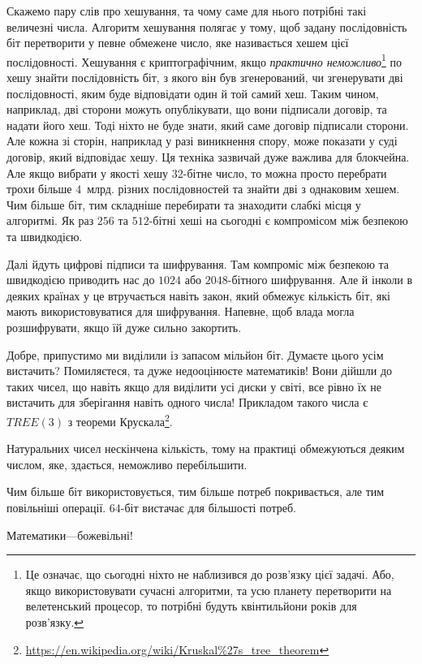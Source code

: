 \documentclass{book}
\newcommand{\kruskalref}{\href{https://en.wikipedia.org/wiki/Kruskal\%27s_tree_theorem}{https://en.wikipedia.org/wiki/Kruskal\%27s\_tree\_theorem}}
\begin{document}
Скажемо пару слів про хешування, та чому саме для нього потрібні такі величезні числа.
Алгоритм хешування полягає у тому, щоб задану послідовність біт перетворити у певне обмежене число, яке називається хешем цієї послідовності.
Хешування є криптографічним, якщо \textit{практично неможливо}\footnote{
  Це означає, що сьогодні ніхто не наблизився до розв'язку цієї задачі.
  Або, якщо використовувати сучасні алгоритми, та усю планету перетворити на велетенський процесор, то потрібні будуть квінтильйони років для розв'язку.
} по хешу знайти послідовність біт, з якого він був згенерований, чи згенерувати дві послідовності, яким буде відповідати один й той самий хеш.
Таким чином, наприклад, дві сторони можуть опублікувати, що вони підписали договір, та надати його хеш.
Тоді ніхто не буде знати, який саме договір підписали сторони.
Але кожна зі сторін, наприклад у разі виникнення спору, може показати у суді договір, який відповідає хешу.
Ця техніка зазвичай дуже важлива для блокчейна.
Але якщо вибрати у якості хешу $32$-бітне число, то можна просто перебрати трохи більше $4$~млрд. різних послідовностей та знайти дві з однаковим хешем.
Чим більше біт, тим складніше перебирати та знаходити слабкі місця у алгоритмі.
Як раз $256$ та $512$-бітні хеші на сьогодні є компромісом між безпекою та швидкодією.

Далі йдуть цифрові підписи та шифрування.
Там компроміс між безпекою та швидкодією приводить нас до $1024$ або $2048$-бітного шифрування.
Але й інколи в деяких країнах у це втручається навіть закон, який обмежує кількість біт, які мають використовуватися для шифрування.
Напевне, щоб влада могла розшифрувати, якщо їй дуже сильно закортить.

Добре, припустимо ми виділили із запасом мільйон біт.
Думаєте цього усім вистачить?
Помиляєтеся, та дуже недооцінюєте математиків!
Вони дійшли до таких чисел, що навіть якщо для виділити усі диски у світі, все рівно їх не вистачить для зберігання навіть одного числа!
Прикладом такого числа є $TREE(3)$ з теореми Крускала\footnote{\kruskalref}.

\begin{summary}
\item Натуральних чисел нескінчена кількість, тому на практиці обмежуються деяким числом, яке, здається, неможливо перебільшити.
\item Чим більше біт використовується, тим більше потреб покривається, але тим повільніші операції. $64$-біт вистачає для більшості потреб.
\item Математики---божевільні!
\end{summary}
\end{document}
